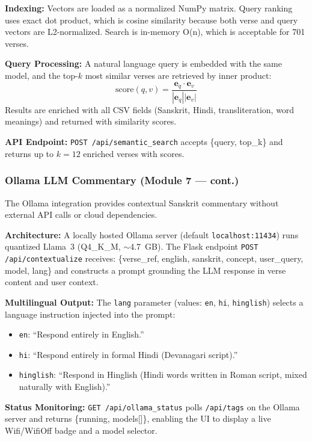\documentclass[conference]{IEEEtran}
\begin{document}
\textbf{Indexing:} Vectors are loaded as a normalized NumPy matrix. Query ranking uses exact dot product, which is cosine similarity because both verse and query vectors are L2-normalized. Search is in-memory O(n), which is acceptable for 701 verses.

\textbf{Query Processing:} A natural language query is embedded with the
same model, and the top-$k$ most similar verses are retrieved by inner
product:
\begin{equation}
  \text{score}(q, v) = \frac{\mathbf{e}_q \cdot \mathbf{e}_v}
  {|\mathbf{e}_q||\mathbf{e}_v|}
  \label{eq:cosine}
\end{equation}
Results are enriched with all CSV fields (Sanskrit, Hindi, transliteration,
word meanings) and returned with similarity scores.

\textbf{API Endpoint:} \texttt{POST /api/semantic\_search} accepts
\{query, top\_k\} and returns up to $k = 12$ enriched verses with scores.

\subsubsection{Ollama LLM Commentary (Module 7 — cont.)}

The Ollama integration provides contextual Sanskrit commentary without
external API calls or cloud dependencies.

\textbf{Architecture:} A locally hosted Ollama server (default
\texttt{localhost:11434}) runs quantized Llama~3 (Q4\_K\_M, $\sim$4.7~GB).
The Flask endpoint \texttt{POST /api/contextualize} receives:
\{verse\_ref, english, sanskrit, concept, user\_query, model, lang\}
and constructs a prompt grounding the LLM response in verse content and user context.

\textbf{Multilingual Output:} The \texttt{lang} parameter (values: \texttt{en},
\texttt{hi}, \texttt{hinglish}) selects a language instruction injected into the
prompt:
\begin{itemize}[leftmargin=*]
  \item \texttt{en}: ``Respond entirely in English.''
  \item \texttt{hi}: ``Respond entirely in formal Hindi (Devanagari script).''
  \item \texttt{hinglish}: ``Respond in Hinglish (Hindi words written in Roman
        script, mixed naturally with English).''
\end{itemize}

\textbf{Status Monitoring:} \texttt{GET /api/ollama\_status} polls
\texttt{/api/tags} on the Ollama server and returns \{running, models[]\},
enabling the UI to display a live Wifi/WifiOff badge and a model selector.
\end{document}
